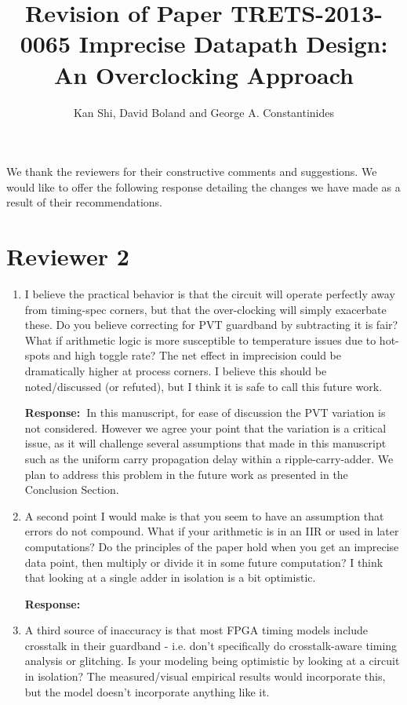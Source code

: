 \documentclass[a4paper, 11pt]{article}
\title{Revision of Paper TRETS-2013-0065 Imprecise Datapath Design: An Overclocking Approach}
\author{Kan Shi, David Boland and George A. Constantinides}
\date{}
\def\Response{\noindent \textbf{Response:~}}
\newcommand{\Question}[1]{\textcolor[rgb]{0.51,0.00,0.00}{#1}}
\begin{document}
\maketitle

We thank the reviewers for their constructive comments and suggestions. We would like to offer the following response detailing the changes we have made as a result of their recommendations.

\section*{Reviewer 2}
\begin{enumerate}
  \item \Question{I believe the practical behavior is that the circuit will operate perfectly away from timing-spec corners, but that the over-clocking will simply exacerbate these. Do you believe correcting for PVT guardband by subtracting it is fair? What if arithmetic logic is more susceptible to temperature issues due to hot-spots and high toggle rate? The net effect in imprecision could be dramatically higher at process corners. I believe this should be noted/discussed (or refuted), but I think it is safe to call this future work.}
      
      \Response In this manuscript, for ease of discussion the PVT variation is not considered. However we agree your point that the variation is a critical issue, as it will challenge several assumptions that made in this manuscript such as the uniform carry propagation delay within a ripple-carry-adder. We plan to address this problem in the future work as presented in the Conclusion Section.
      
  \item \Question{A second point I would make is that you seem to have an assumption that errors do not compound. What if your arithmetic is in an IIR or used in later computations? Do the principles of the paper hold when you get an imprecise data point, then multiply or divide it in some future computation?  I think that looking at a single adder in isolation is a bit optimistic.}
      
      \Response 
      
  \item \Question{A third source of inaccuracy is that most FPGA timing models include crosstalk in their guardband - i.e. don't specifically do crosstalk-aware timing analysis or glitching.  Is your modeling being optimistic by looking at a circuit in isolation?  The measured/visual empirical results would incorporate this, but the model doesn't incorporate anything like it.}
      

\end{enumerate}
\end{document}
